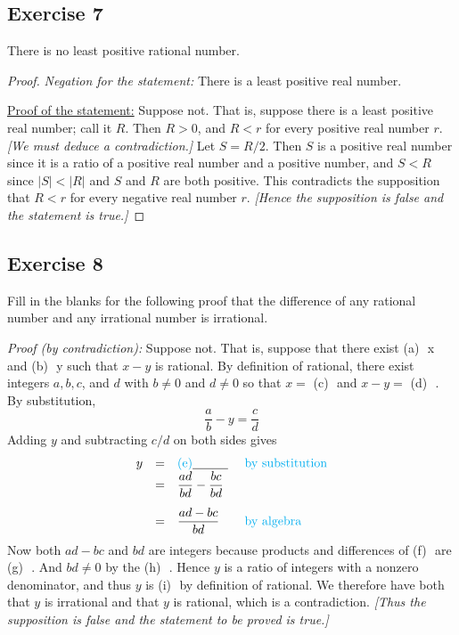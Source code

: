 \documentclass[14pt]{extarticle}
\newcommand{\dps}{\displaystyle}
\newcommand{\fbl}{\underline{\hspace{1cm}}\,\,}
\newcommand{\cy}{\color{cyan}}
\begin{document}
\subsection{Exercise 7}
There is no least positive rational number.

\begin{proof}
{\it Negation for the statement:} There is a least positive real number.

\underline{Proof of the statement:} Suppose not. That is, suppose there is a least positive real number; call it $R$. Then $R > 0$, and $R < r$ for every positive real number $r$. {\it [We must deduce a contradiction.]} Let $S = R / 2$. Then $S$ is a positive real number since it is a ratio of a positive real number and a positive number, and $S < R$ since $|S| < |R|$ and $S$ and $R$ are both positive. This contradicts the supposition that $R < r$ for every negative real number $r$. {\it [Hence the supposition is false and the statement is true.]}
\end{proof}

\subsection{Exercise 8}
Fill in the blanks for the following proof that the difference of any rational number and any irrational number is irrational.

{\it Proof (by contradiction):} Suppose not. That is, suppose that there exist {\cy (a)} \fbl x and {\cy (b)} \fbl y such that $x - y$ is rational. By definition of rational, there exist integers $a, b, c$, and $d$ with $b \neq 0$ and $d \neq 0$ so that $x =$ {\cy (c)} \fbl and $x - y =$ {\cy (d)} \fbl. By substitution,
\[
\frac{a}{b} - y = \frac{c}{d}
\]
Adding $y$ and subtracting $c/d$ on both sides gives
\[
\begin{array}{rcll}
y & = & \text{\cy (e)} \fbl& \text{\cy by substitution}\\
\vspace{0.3cm}
  & = & \dps\frac{ad}{bd} - \frac{bc}{bd}& \\
  & = & \dps\frac{ad - bc}{bd} & \text{\cy by algebra}\\
\end{array}
\]
Now both $ad - bc$ and $bd$ are integers because products and differences of {\cy (f)} \fbl are {\cy (g)} \fbl. And $bd \neq 0$ by the {\cy (h)} \fbl. Hence $y$ is a ratio of integers with a nonzero denominator, and thus $y$ is {\cy (i)} \fbl by definition of rational. We therefore have both that $y$ is irrational and that $y$ is rational, which is a contradiction. {\it[Thus the supposition is false and the
statement to be proved is true.]}
\end{document}
